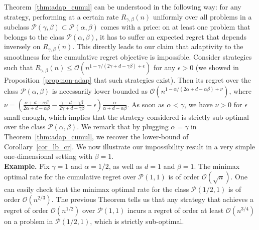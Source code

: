 \documentclass[final,12pt]{colt2018}
\newtheorem{ex}{Example}
\newcommand{\bigO}[1]{\mathcal O\left( #1 \right)}
\begin{document}
Theorem~\ref{thm:adap_cumul} can be understood in the following way: for any strategy, performing at a certain rate $R_{\gamma,\beta}(n)$ uniformly over all problems in a subclass $\mathcal P(\gamma, \beta) \subset \mathcal P(\alpha, \beta)$ comes with a price: on at least one problem that belongs to the class $\mathcal P(\alpha, \beta)$, it has to suffer an expected regret that depends inversely on $R_{\gamma,\beta}(n)$. This directly leads to our claim that adaptivity to the smoothness for the cumulative regret objective is impossible. Consider strategies such that $R_{\gamma,\beta}(n) \leq \bigO{n^{1-\gamma/(2\gamma+d-\gamma\beta)+\epsilon}}$ for any $\epsilon > 0$ (we showed in Proposition~\ref{prop:non-adap} that such strategies exist). Then its regret over the class $\mathcal P(\alpha, \beta)$ is necessarily lower bounded as $\bigO{n^{1-\alpha/(2\alpha+d-\alpha\beta)+\nu}}$, where $\nu =\left(\frac{\alpha+d-\alpha\beta}{2\alpha+d-\alpha\beta} - \frac{\gamma+d-\gamma\beta}{2\gamma+d-\gamma\beta} - \epsilon\right)\frac{\alpha}{\alpha+d-\alpha\beta}$. As soon as $\alpha < \gamma$, we have $\nu > 0$ for $\epsilon$ small enough, which implies that the strategy considered is strictly sub-optimal over the class $\mathcal P(\alpha,\beta)$. We remark that by plugging $\alpha = \gamma$ in Theorem~\ref{thm:adap_cumul}, we recover the lower-bound of Corollary~\ref{cor_lb_cr}. We now illustrate our impossibility result in a very simple one-dimensional setting with $\beta = 1$.\\

\noindent\textbf{Example.} Fix $\gamma =1$ and $\alpha = 1/2$, as well as $d = 1$ and $\beta = 1$. The minimax optimal rate for the cumulative regret over $\mathcal P(1, 1)$ is of order $\bigO{\sqrt{n}}$. One can easily check that the minimax optimal rate for the class $\mathcal P(1/2, 1)$ is of order $\bigO{n^{2/3}}$. The previous Theorem tells us that any strategy that achieves a regret of order $\bigO{n^{1/2}}$ over $\mathcal P(1, 1)$ incurs a regret of order at least $\bigO{n^{3/4}}$ on a problem in $\mathcal P(1/2, 1)$, which is strictly sub-optimal.



\end{document}
